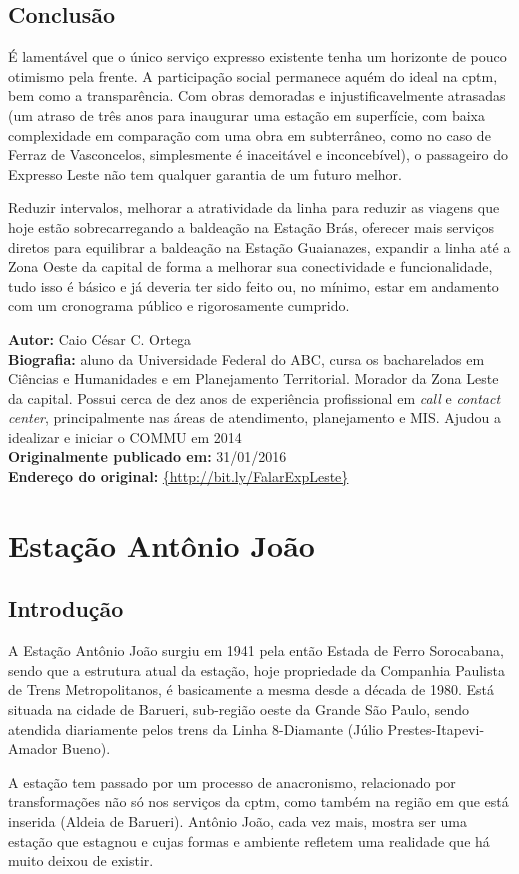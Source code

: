 \documentclass[11pt,fleqn]{book} %
\newcommand{\infocaio}[2]{\textbf{Autor:} Caio C\'{e}sar C. Ortega \\ \textbf{Biografia:} aluno da Universidade Federal do ABC, cursa os bacharelados em Ci\^{e}ncias e Humanidades e em Planejamento Territorial. Morador da Zona Leste da capital. Possui cerca de dez anos de experi\^{e}ncia profissional em \textit{call} e \textit{contact center}, principalmente nas \'{a}reas de atendimento, planejamento e MIS. Ajudou a idealizar e iniciar o COMMU em 2014 \\ \textbf{Originalmente publicado em:} {#1} \\ \textbf{Endere\c{c}o do original:} \url{{#2}}}
\begin{document}
\subsection{Conclusão}

É lamentável que o único serviço expresso existente tenha um horizonte de pouco otimismo pela frente. A participação social permanece aquém do ideal na \gls{cptm}, bem como a transparência. Com obras demoradas e injustificavelmente atrasadas (um atraso de três anos para inaugurar uma estação em superfície, com baixa complexidade em comparação com uma obra em subterrâneo, como no caso de Ferraz de Vasconcelos, simplesmente é inaceitável e inconcebível), o passageiro do Expresso Leste não tem qualquer garantia de um futuro melhor.

Reduzir intervalos, melhorar a atratividade da linha para reduzir as viagens que hoje estão sobrecarregando a baldeação na Estação Brás, oferecer mais serviços diretos para equilibrar a baldeação na Estação Guaianazes, expandir a linha até a Zona Oeste da capital de forma a melhorar sua conectividade e funcionalidade, tudo isso é básico e já deveria ter sido feito ou, no mínimo, estar em andamento com um cronograma público e rigorosamente cumprido.

\begin{info}
	\infocaio{31/01/2016}{http://bit.ly/FalarExpLeste}
\end{info}

\section{Estação Antônio João}

\subsection{Introdução}

A Estação Antônio João surgiu em 1941 pela então Estada de Ferro Sorocabana, sendo que a estrutura atual da estação, hoje propriedade da Companhia Paulista de Trens Metropolitanos, é basicamente a mesma desde a década de 1980. Está situada na cidade de Barueri, sub-região oeste da Grande São Paulo, sendo atendida diariamente pelos trens da Linha 8-Diamante (Júlio Prestes-Itapevi-Amador Bueno).

A estação tem passado por um processo de anacronismo, relacionado por transformações não só nos serviços da \gls{cptm}, como também na região em que está inserida (Aldeia de Barueri). Antônio João, cada vez mais, mostra ser uma estação que estagnou e cujas formas e ambiente refletem uma realidade que há muito deixou de existir.
\end{document}
